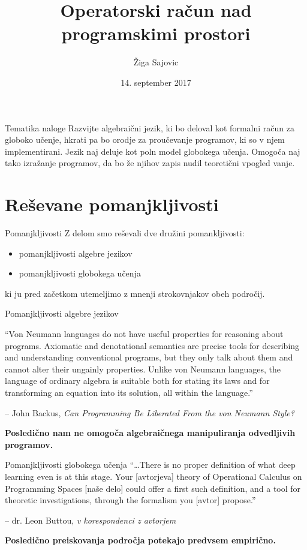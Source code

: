 \documentclass{beamer}
\title{Operatorski račun nad programskimi prostori}
\date{14. september 2017}
\author{Žiga Sajovic}
\institute{Univerza v Ljubljani, Fakulteta za Računlništvo in Informatiko}
\begin{document}
\maketitle

\begin{frame}{Tematika naloge}
Razvijte algebraični jezik, ki bo deloval kot formalni račun za globoko učenje, hkrati pa bo orodje za proučevanje programov, ki so v njem implementirani. Jezik naj deluje kot poln model globokega učenja. Omogoča naj tako izražanje programov, da bo že njihov zapis nudil teoretični vpogled vanje.
\end{frame}
\section{Reševane pomanjkljivosti}

\begin{frame}{Pomanjkljivosti}
Z delom smo reševali dve družini pomankljivosti:
\begin{itemize}
\item
pomanjkljivosti algebre jezikov
\item
pomanjkljivosti globokega učenja
\end{itemize}
ki ju pred začetkom utemeljimo z mnenji strokovnjakov obeh področij.
\end{frame}

\begin{frame}{Pomanjkljivosti algebre jezikov}

``Von Neumann languages do not have useful properties for reasoning about programs. Axiomatic and denotational semantics are precise tools for describing and understanding conventional programs, but they only talk about them and cannot alter their ungainly properties. Unlike von Neumann languages, the language of ordinary algebra is suitable both for stating its laws and for transforming an equation into its solution, all within the language.''

-- John Backus, \textit{Can Programming Be Liberated From the von Neumann Style?}

\textbf{Posledično nam ne omogoča algebraičnega manipuliranja odvedljivih programov.}

\end{frame}

\begin{frame}{Pomanjkljivosti globokega učenja}
``\dots There is no proper definition of what deep learning even is at this stage. Your [avtorjeva] theory of Operational Calculus on Programming Spaces [naše delo] could offer a first such definition, and a tool for theoretic investigations, through the formalism you [avtor] propose.''

-- dr. Leon Buttou, \textit{v korespondenci z avtorjem}

\textbf{Posledično preiskovanja področja potekajo predvsem empirično.}

\end{frame}
\end{document}
